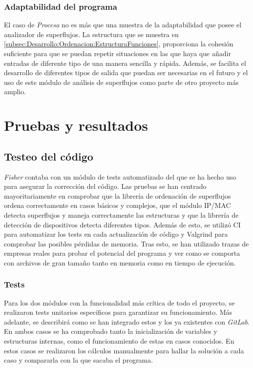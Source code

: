 \documentclass[tfg,epsbased,lof,lot,loa,final,nocopyright,overleaf]{tfgtfmthesisuam}
\begin{document}
\subsection{Adaptabilidad del programa}
El caso de \textit{Procesa} no es más que una muestra de la adaptabilidad que posee el analizador de superflujos. La estructura que se muestra en \ref{subsec:Desarrollo:Ordenacion:EstructuraFunciones}, proporciona la cohesión suficiente para que se puedan repetir situaciones en las que haya que añadir entradas de diferente tipo de una manera sencilla y rápida. Además, se facilita el desarrollo de diferentes tipos de salida que puedan ser necesarias en el futuro y el uso de este módulo de análisis de superflujos como parte de otro proyecto más amplio.

\chapter{Pruebas y resultados}
\section{Testeo del código}
\label{chap:Pruebas:Test}
\textit{Fisher} contaba con un módulo de tests automatizado del que se ha hecho uso para asegurar la corrección del código. Las pruebas se han centrado mayoritariamente en comprobar que la librería de ordenación de superflujos ordena correctamente en casos básicos y complejos, que el módulo IP/MAC detecta superflujos y maneja correctamente las estructuras y que la librería de detección de dispositivos detecta diferentes tipos. Además de esto, se utilizó CI para automatizar los tests en cada actualización de código y Valgrind para comprobar las posibles pérdidas de memoria. Tras esto, se han utilizado trazas de empresas reales para probar el potencial del programa y ver como se comporta con archivos de gran tamaño tanto en memoria como en tiempo de ejecución. 

\subsection{Tests}
\label{subsec:Pruebas:Tests:Tests}

Para los dos módulos con la funcionalidad más crítica de todo el proyecto, se realizaron tests unitarios específicos para garantizar su funcionamiento. Más adelante, se describirá como se han integrado estos y los ya existentes con \textit{GitLab}. En ambos casos se ha comprobado tanto la inicialización de variables y estructuras internas, como el funcionamiento de estas en casos conocidos. En estos casos se realizaron los cálculos manualmente para hallar la solución a cada caso y compararla con la que sacaba el programa.
\end{document}
